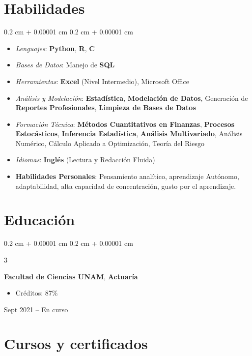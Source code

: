 \documentclass[10pt, letterpaper]{article}
\newenvironment{highlights}{
    \begin{itemize}[
        topsep=0.10 cm,
        parsep=0.10 cm,
        partopsep=0pt,
        itemsep=0pt,
        leftmargin=0.4 cm + 10pt
    ]
}{
    \end{itemize}
} %
\newenvironment{highlightsforbulletentries}{
    \begin{itemize}[
        topsep=0.10 cm,
        parsep=0.10 cm,
        partopsep=0pt,
        itemsep=0pt,
        leftmargin=10pt
    ]
}{
    \end{itemize}
} %
\newenvironment{onecolentry}{
    \begin{adjustwidth}{
        0.2 cm + 0.00001 cm
    }{
        0.2 cm + 0.00001 cm
    }
}{
    \end{adjustwidth}
} %
\newenvironment{threecolentry}[3][]{
    \onecolentry
    \def\thirdColumn{#3}
    \setcolumnwidth{1 cm, \fill, 4.5 cm}
    \begin{paracol}{3}
    {\raggedright #2} \switchcolumn
}{
    \switchcolumn \raggedleft \thirdColumn
    \end{paracol}
    \endonecolentry
} %
\begin{document}
    \section{Habilidades}

\begin{onecolentry}
    \begin{highlightsforbulletentries}
        \item \textit{Lenguajes}: \textbf{Python}, \textbf{R}, \textbf{C}
        \item \textit{Bases de Datos}: Manejo de \textbf{SQL}
        \item \textit{Herramientas}: \textbf{Excel} (Nivel Intermedio), Microsoft Office
        \item \textit{Análisis y Modelación}: \textbf{Estadística}, \textbf{Modelación de Datos}, Generación de \textbf{Reportes Profesionales}, \textbf{Limpieza de Bases de Datos}
        \item \textit{Formación Técnica}: \textbf{Métodos Cuantitativos en Finanzas}, \textbf{Procesos Estocásticos}, \textbf{Inferencia Estadística}, \textbf{Análisis Multivariado}, Análisis Numérico, Cálculo Aplicado a Optimización, Teoría del Riesgo
        \item \textit{Idiomas}: \textbf{Inglés} (Lectura y Redacción Fluida)
        \item \textbf{Habilidades Personales}: Pensamiento analítico, aprendizaje Autónomo, adaptabilidad, alta capacidad de concentración, gusto por el aprendizaje.
    \end{highlightsforbulletentries}
\end{onecolentry}

    \section{Educación}

        \begin{threecolentry}{\textbf{}}{
            Sept 2021 – En curso
        }
            \textbf{Facultad de Ciencias UNAM}, \textbf{Actuaría}
            \begin{highlights}
                \item Créditos: 87\%
            \end{highlights}
        \end{threecolentry}

    \section{Cursos y certificados}
\end{document}

